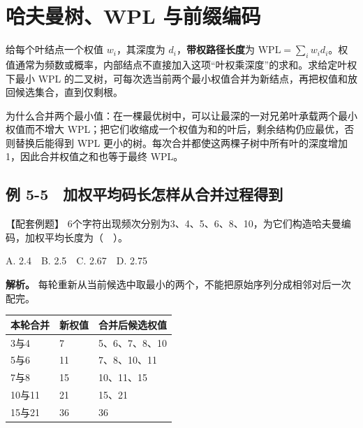 \section{哈夫曼树、WPL 与前缀编码}\label{DS05-09}

给每个叶结点一个权值 \(w_i\)，其深度为 \(d_i\)，\textbf{带权路径长度}为 \(\mathrm{WPL}=\sum_iw_id_i\)。权值通常为频数或概率，内部结点不直接加入这项``叶权乘深度''的求和。求给定叶权下最小 WPL 的二叉树，可每次选当前两个最小权值合并为新结点，再把权值和放回候选集合，直到仅剩根。

为什么合并两个最小值：在一棵最优树中，可以让最深的一对兄弟叶承载两个最小权值而不增大 WPL；把它们收缩成一个权值为和的叶后，剩余结构仍应最优，否则替换后能得到 WPL 更小的树。每次合并都使这两棵子树中所有叶的深度增加1，因此合并权值之和也等于最终 WPL。

\subsection{例 5-5　加权平均码长怎样从合并过程得到}\label{DS05-ex5}

\begin{example}[配套案例]

【配套例题】 6个字符出现频次分别为3、4、5、6、8、10，为它们构造哈夫曼编码，加权平均长度为（　）。

A. 2.4　B. 2.5　C. 2.67　D. 2.75

\end{example}

\textbf{解析。} 每轮重新从当前候选中取最小的两个，不能把原始序列分成相邻对后一次配完。

\begin{wideblock}

\par\medskip\noindent\begin{minipage}{\linewidth}\fontsize{9.3}{12}\selectfont\begin{tabularx}{\linewidth}{@{}YYY@{}}
\toprule\noalign{}
本轮合并 & 新权值 & 合并后候选权值 \\
\midrule\noalign{}


3与4 & 7 & 5、6、7、8、10 \\
5与6 & 11 & 7、8、10、11 \\
7与8 & 15 & 10、11、15 \\
10与11 & 21 & 15、21 \\
15与21 & 36 & 36 \\
\bottomrule\end{tabularx}
\end{minipage}\par\medskip

\end{wideblock}

